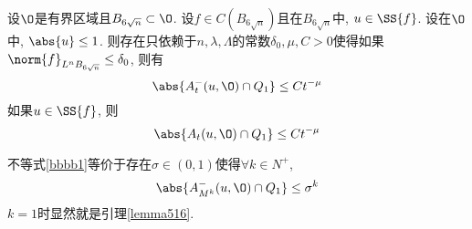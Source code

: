 \begin{lemma}\label{lemma515}
    设$\O$是有界区域且$B_{6\sqrt{n}} \subset \O$.  设$f \in C(B_{6\sqrt{n}})$且在$B_{6\sqrt{n}}$中, $u \in \SS{f}$.  设在$\O$中, $\abs{u} \le 1$.  则存在只依赖于$n, \lambda, \Lambda$的常数$\delta_0, \mu, C>0$使得如果 $\norm{f}_{L^n{B_{6\sqrt{n}}}} \le \delta_0$, 则有
    \begin{equation} \label{bbbb1}
        \abs{A^-_t(u, \O) \cap Q_1} \le Ct^{-\mu}
    \end{equation}
    如果$u \in \SS{f}$, 则
    \begin{equation}
        \abs{A_t(u, \O) \cap Q_1} \le Ct^{-\mu}
    \end{equation}
\end{lemma}
\begin{remark}
    不等式\eqref{bbbb1}等价于存在$\sigma\in (0, 1)$使得$\forall k \in N^+$, 
    \begin{equation*}
        \abs{A^-_{M^k}(u, \O) \cap Q_1} \le \sigma^k
    \end{equation*}
    $k=1$时显然就是引理\eqref{lemma516}.  
\end{remark}
